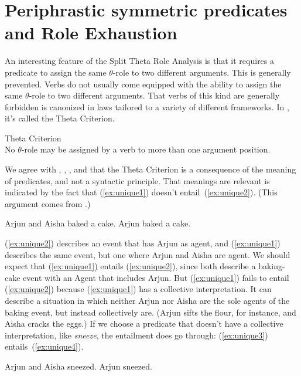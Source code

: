 \documentclass[twoside, 12pt]{article}
\begin{document}
\section{Periphrastic symmetric predicates and Role Exhaustion}
\label{periphrastic}

An interesting feature of the Split Theta Role Analysis is that it requires a predicate to assign the same $\theta$-role to two different arguments. This is generally prevented. Verbs do not usually come equipped with the ability to assign the same $\theta$-role to two different arguments. That verbs of this kind are generally forbidden is canonized in laws tailored to a variety of different frameworks. In \citet{Chomsky:1981}, it's called the Theta Criterion.
\begin{exe}
\raggedright
  \ex \label{ex:TC} Theta Criterion\\
  No $\theta$-role may be assigned by a verb to more than one argument position.
\end{exe}
We agree with \citet{Carlson:1984aa}, \citet{Dowty:1989}, \citet{Schein:1993}, and \citet{Williams:2015} that the Theta Criterion is a consequence of the meaning of predicates, and not a syntactic principle. That meanings are relevant is indicated by the fact that (\ref{ex:unique1}) doesn't entail~(\ref{ex:unique2}). (This argument comes from \citealt{Schein:1993}.)
\begin{exe}
\raggedright
  \ex \label{ex:unique}
  \begin{xlist}
    \ex \label{ex:unique1} Arjun and Aisha baked a cake.
    \ex \label{ex:unique2} Arjun baked a cake.
  \end{xlist}
\end{exe}
(\ref{ex:unique2}) describes an event that has Arjun as agent, and (\ref{ex:unique1}) describes the same event, but one where Arjun and Aisha are agent. We should expect that (\ref{ex:unique1}) entails (\ref{ex:unique2}), since both describe a baking-cake event with an Agent that includes Arjun. But (\ref{ex:unique1}) fails to entail (\ref{ex:unique2}) because (\ref{ex:unique1}) has a collective interpretation. It can describe a situation in which neither Arjun nor Aisha are the sole agents of the baking event, but instead collectively are. (Arjun sifts the flour, for instance, and Aisha cracks the eggs.) If we choose a predicate that doesn't have a collective interpretation, like \textit{sneeze}, the entailment does go through: (\ref{ex:unique3}) entails~(\ref{ex:unique4}).
\begin{exe}
\raggedright
  \ex \label{ex:unique3} Arjun and Aisha sneezed.
  \ex \label{ex:unique4} Arjun sneezed.
\end{exe}
\end{document}
